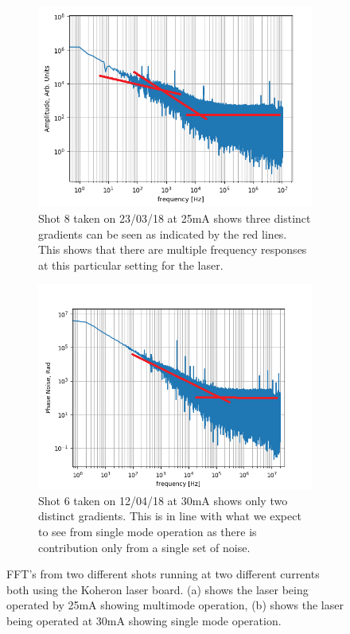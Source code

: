 \documentclass[12pt,a4paper,oneside]{report}
\begin{document}
\begin{figure}
  \begin{subfigure}{.5\textwidth}
    \centering\captionsetup{width=.90\linewidth}
    \includegraphics[width=\textwidth,angle=0]{DImages/FFT_for_shot_8_Date_20180323.png}
    \caption{Shot 8 taken on 23/03/18 at 25mA shows three distinct gradients can be seen as indicated by the red lines. This shows that there are multiple frequency responses at this particular setting for the laser.}
  \end{subfigure}
  \begin{subfigure}{.5\textwidth}
    \centering\captionsetup{width=.95\linewidth}
    \includegraphics[width=\textwidth, angle=0]{DImages/FFT_for_shot_6_Date_20180412.png}
    \caption{Shot 6 taken on 12/04/18 at 30mA shows only two distinct gradients. This is in line with what we expect to see from single mode operation as there is contribution only from a single set of noise.}
  \end{subfigure}
\caption{FFT's from two different shots running at two different currents both using the Koheron laser board. (a) shows the laser being operated by 25mA showing multimode operation, (b) shows the laser being operated at 30mA showing single mode operation. }
\label{fig:singlemode_multimode}
\end{figure}
\end{document}

